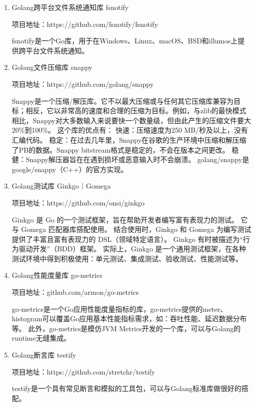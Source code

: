 	\begin{enumerate}[fullwidth,itemindent=2em,listparindent=2em]
	
		\item Golang跨平台文件系统通知库 fsnotify
		
		项目地址：https://github.com/fsnotify/fsnotify

		fsnotify是一个Go库，用于在Windows、Linux、macOS、BSD和illumos上提供跨平台文件系统通知。

		\item Golang文件压缩库 snappy
		
		项目地址：https://github.com/golang/snappy

		Snappy是一个压缩/解压库。它不以最大压缩或与任何其它压缩库兼容为目标；相反，它以非常高的速度和合理的压缩为目标。例如，与zlib的最快模式相比，Snappy对大多数输入来说要快一个数量级，但由此产生的压缩文件要大20\%到100\%。
		这个库的优点有：
		快速：压缩速度为250 MB/秒及以上，没有汇编代码。
		稳定：在过去几年里，Snappy在谷歌的生产环境中压缩和解压缩了PB的数据。Snappy bitstream格式是稳定的，不会在版本之间更改。
		稳健：Snappy解压器旨在在遇到损坏或恶意输入时不会崩溃。
		golang/snappy是google/snappy（C++）的官方实现。

		\item Golang测试库 Ginkgo｜Gomega
		
		项目地址：https://github.com/onsi/ginkgo

		Ginkgo 是 Go 的一个测试框架，旨在帮助开发者编写富有表现力的测试。 
		它与 Gomega 匹配器库搭配使用。 
		结合使用时，Ginkgo 和 Gomega 为编写测试提供了丰富且富有表现力的 DSL（领域特定语言）。
		Ginkgo 有时被描述为“行为驱动开发”（BDD）框架。 
		实际上，Ginkgo 是一个通用测试框架，在各种测试环境中得到积极使用：单元测试、集成测试、验收测试、性能测试等。
		
		\item Golang性能度量库 go-metrics
		
		项目地址：github.com/armon/go-metrics 
		
		go-metrics是一个Go应用性能度量指标的库，go-metrics提供的meter、histogram可以覆盖Go应用基本性能指标需求，如：吞吐性能、延迟数据分布等。
		此外，go-metrics是模仿JVM Metrics开发的一个库，可以与Golang的runtime无缝集成。
		
		
		\item Golang断言库 testify
		
		项目地址：https://github.com/stretchr/testify

		testify是一个具有常见断言和模拟的工具包，可以与Golang标准库做很好的搭配。
		

	\end{enumerate}
	

	
\clearpage